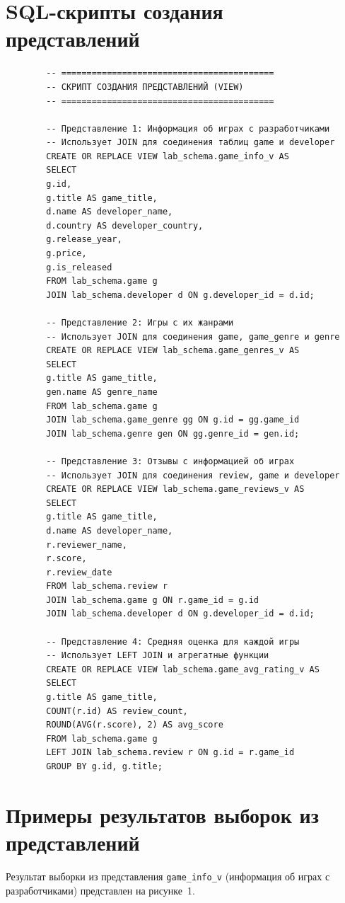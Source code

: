 \documentclass[oneside,a4paper,14pt]{extarticle}
\begin{document}
	\newpage
	
	\section*{SQL-скрипты создания представлений}
	
	\begin{lstlisting}
		-- ==========================================
		-- СКРИПТ СОЗДАНИЯ ПРЕДСТАВЛЕНИЙ (VIEW)
		-- ==========================================
		
		-- Представление 1: Информация об играх с разработчиками
		-- Использует JOIN для соединения таблиц game и developer
		CREATE OR REPLACE VIEW lab_schema.game_info_v AS
		SELECT 
		g.id,
		g.title AS game_title,
		d.name AS developer_name,
		d.country AS developer_country,
		g.release_year,
		g.price,
		g.is_released
		FROM lab_schema.game g
		JOIN lab_schema.developer d ON g.developer_id = d.id;
		
		-- Представление 2: Игры с их жанрами
		-- Использует JOIN для соединения game, game_genre и genre
		CREATE OR REPLACE VIEW lab_schema.game_genres_v AS
		SELECT 
		g.title AS game_title,
		gen.name AS genre_name
		FROM lab_schema.game g
		JOIN lab_schema.game_genre gg ON g.id = gg.game_id
		JOIN lab_schema.genre gen ON gg.genre_id = gen.id;
		
		-- Представление 3: Отзывы с информацией об играх
		-- Использует JOIN для соединения review, game и developer
		CREATE OR REPLACE VIEW lab_schema.game_reviews_v AS
		SELECT 
		g.title AS game_title,
		d.name AS developer_name,
		r.reviewer_name,
		r.score,
		r.review_date
		FROM lab_schema.review r
		JOIN lab_schema.game g ON r.game_id = g.id
		JOIN lab_schema.developer d ON g.developer_id = d.id;
		
		-- Представление 4: Средняя оценка для каждой игры
		-- Использует LEFT JOIN и агрегатные функции
		CREATE OR REPLACE VIEW lab_schema.game_avg_rating_v AS
		SELECT 
		g.title AS game_title,
		COUNT(r.id) AS review_count,
		ROUND(AVG(r.score), 2) AS avg_score
		FROM lab_schema.game g
		LEFT JOIN lab_schema.review r ON g.id = r.game_id
		GROUP BY g.id, g.title;
	\end{lstlisting}
	
	\newpage
	
	\section*{Примеры результатов выборок из представлений}
	
	Результат выборки из представления \texttt{game\_info\_v} (информация об играх с разработчиками) представлен на рисунке~1.
	
\end{document}
